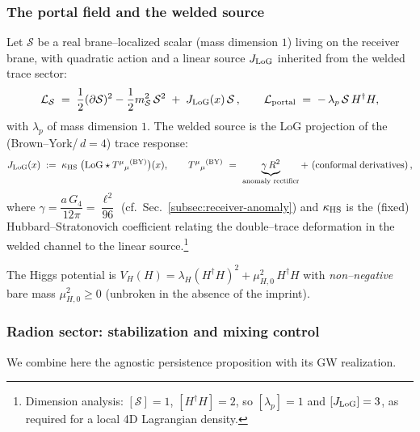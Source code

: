 \documentclass[10pt]{article}
\theoremstyle{definition}
\theoremstyle{plain}
\begin{document}
\subsubsection*{The portal field and the welded source}\label{subsubsec:uom-main-013}
Let $\mathcal S$ be a real brane–localized scalar (mass dimension $1$) living on the receiver brane,
with quadratic action and a linear source $J_{\rm LoG}$ inherited from the welded trace sector:
\begin{equation}
\label{eq:S-portal-loc}
\mathcal L_{\mathcal S}\;=\;\frac12(\partial \mathcal S)^2-\frac12 m_{\mathcal S}^2\,\mathcal S^2
\;+\;J_{\rm LoG}(x)\,\mathcal S\,,
\qquad
\mathcal L_{\rm portal}\;=\;-\,\lambda_p\,\mathcal S\,H^\dagger H,
\end{equation}
with $\lambda_p$ of mass dimension $1$.
The welded source is the LoG projection of the (Brown–York/\,$d{=}4$) trace response:
\begin{equation}
\label{eq:JLoG-def}
J_{\rm LoG}(x)
\;:=\;\kappa_{\rm HS}\;\big(\mathrm{LoG}\star T^\mu{}_\mu{}^{\rm (BY)}\big)(x),
\qquad
T^\mu{}_\mu{}^{\rm (BY)}\ =\ \underbrace{\gamma\,R^2}_{\text{anomaly rectifier}}+\ \text{(conformal\;derivatives)}\,,
\end{equation}
where $\gamma=\dfrac{a\,G_4}{12\pi}=\dfrac{\ell^2}{96}$ (cf.\ Sec.~\ref{subsec:receiver-anomaly})
and $\kappa_{\rm HS}$ is the (fixed) Hubbard–Stratonovich coefficient relating the double–trace
deformation in the welded channel to the linear source.\footnote{Dimension analysis:
$[\mathcal S]=1$, $[H^\dagger H]=2$, so $[\lambda_p]=1$ and $[J_{\rm LoG}]=3$, as required
for a local 4D Lagrangian density.}

The Higgs potential is
\(
V_H(H)=\lambda_H (H^\dagger H)^2+\mu_{H,0}^2\,H^\dagger H
\)
with \emph{non–negative} bare mass $\mu_{H,0}^2\ge 0$ (unbroken in the absence of the imprint).

\subsubsection*{Radion sector: stabilization and mixing control}\label{subsubsec:uom-main-014}
We combine here the agnostic persistence proposition with its GW realization.
\end{document}
